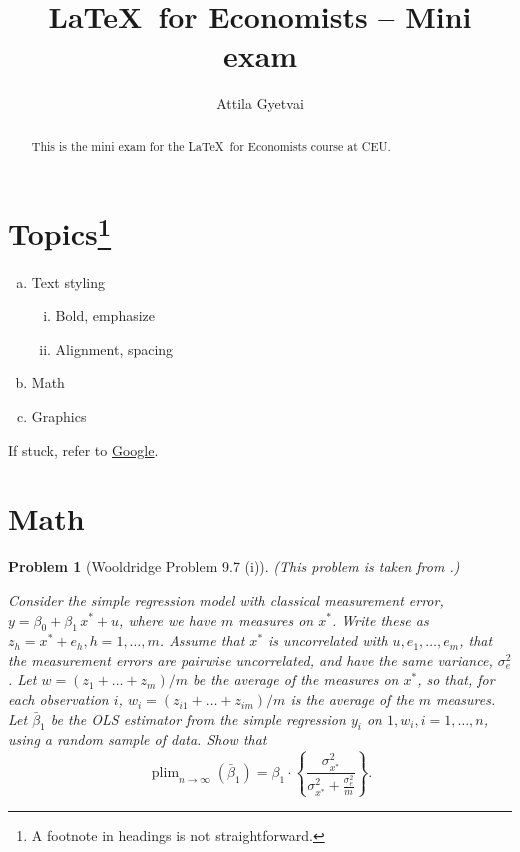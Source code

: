 \documentclass[11pt,a4paper]{article}	%
\title{\LaTeX\ for Economists -- Mini exam}
\author{Attila Gyetvai}
\date{}									%
\newtheorem{problem}{Problem}
\theoremstyle{remark}
\DeclareMathOperator*{\plim}{plim}
\begin{document}
\maketitle

\begin{abstract}
	This is the mini exam for the \LaTeX\ for Economists course at CEU.
\end{abstract}

\tableofcontents
\listoffigures
\listoftables

\section{Topics\footnote{A footnote in headings is not straightforward.}}

\begin{enumerate}[(a)]
	\item
	Text styling
	\begin{enumerate}[(i)]
		\item
		Bold, emphasize
		\item
		Alignment, spacing
	\end{enumerate}
	\item
	Math
	\item
	Graphics
\end{enumerate}

If stuck, refer to \href{http://google.com}{Google}.

\section{Math}

\begin{problem}[Wooldridge Problem 9.7 (i)]
(This problem is taken from \cite{wldr}.)

Consider the simple regression model with classical measurement error, $y = \beta_0 + \beta_1 \, x^* + u$, where we have $m$ measures on $x^*$.
Write these as $z_h = x^* + e_h, h = 1, \ldots , m$.
Assume that $x^*$ is uncorrelated with $u, e_1 , \ldots , e_m$, that the measurement errors are pairwise uncorrelated, and have the same variance, $\sigma_e^2$.
Let $w = (z_1 + \ldots + z_m)/m$ be the average of the measures on $x^*$, so that, for each observation $i$, $w_i = (z_{i1} + \ldots + z_{im})/m$ is the average of the $m$ measures.
Let $\bar{\beta}_1$ be the OLS estimator from the simple regression $y_i$ on $1, w_i , i = 1, \ldots , n$, using a random sample of data.
Show that
\begin{equation}
	\plim_{n \to \infty} (\bar{\beta}_1) = \beta_1 \cdot \left\lbrace \frac{\sigma_{x^*}^2}{\sigma_{x^*}^2 + \frac{\sigma_e^2}{m}} \right\rbrace .
\end{equation}

\end{problem}
\end{document}
